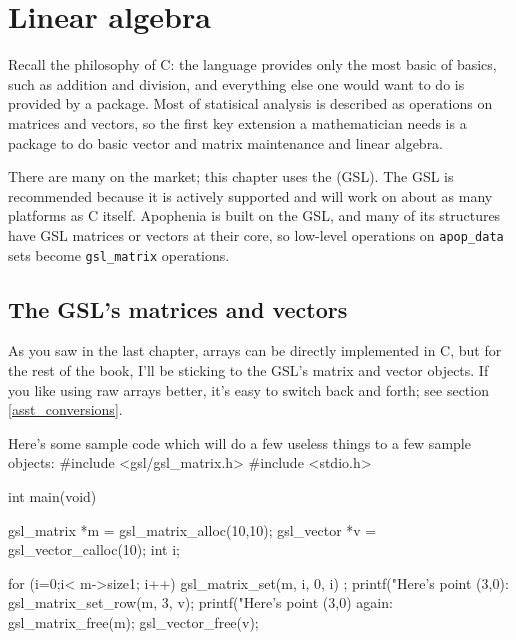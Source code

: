 \chapter[Linear Algebra]{Linear algebra} \label{linear_algebra}

Recall the philosophy of C: the language provides only the most basic of
basics, such as addition and division, and everything else one would
want to do is provided by a package. Most of statisical analysis is
described as operations on matrices and vectors, so the first key
extension a mathematician needs is a package to do basic vector and
matrix maintenance and linear algebra.

There are many on the market; this chapter uses the  (GSL). The GSL is recommended because it is actively supported
and will work on about as many platforms as C itself. Apophenia is built
on the GSL, and many of its structures have GSL matrices or vectors at
their core, so low-level operations on {\tt apop\_\-data} sets become
{\tt gsl\_\-matrix} operations.

\section{The GSL's matrices and vectors}
As you saw in the last chapter, arrays can be directly implemented in C, but for
the rest of the book, I'll be sticking to the GSL's matrix and vector objects.
If you like using raw arrays better, it's easy to switch back and forth; see
section \ref{asst_conversions}.


Here's some sample code which will do a few useless things to a few sample
objects:\label{gslexample}
#include <gsl/gsl_matrix.h>
#include <stdio.h>


int main(void){
   gsl_matrix   *m = gsl_matrix_alloc(10,10);
   gsl_vector   *v = gsl_vector_calloc(10);
   int  i;

   for (i=0;i< m->size1; i++){
      gsl_matrix_set(m, i, 0, i) ;
   }
   printf("Here's point (3,0): %
   gsl_matrix_set_row(m, 3, v);
   printf("Here's point (3,0) again: %
   gsl_matrix_free(m);
   gsl_vector_free(v);
}

